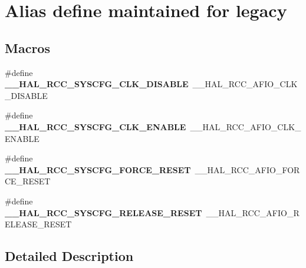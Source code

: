 \hypertarget{group___r_c_c___alias___for___legacy}{}\section{Alias define maintained for legacy}
\label{group___r_c_c___alias___for___legacy}
\subsection*{Macros}
\begin{DoxyCompactItemize}
\item 
\mbox{\label{group___r_c_c___alias___for___legacy_ga524cb83b267a1cac3c64843d79d43e77}} 
\#define {\bfseries \+\_\+\+\_\+\+H\+A\+L\+\_\+\+R\+C\+C\+\_\+\+S\+Y\+S\+C\+F\+G\+\_\+\+C\+L\+K\+\_\+\+D\+I\+S\+A\+B\+LE}~\+\_\+\+\_\+\+H\+A\+L\+\_\+\+R\+C\+C\+\_\+\+A\+F\+I\+O\+\_\+\+C\+L\+K\+\_\+\+D\+I\+S\+A\+B\+LE
\item 
\mbox{\label{group___r_c_c___alias___for___legacy_ga1e50d7ed8e42180bf3096dc1eafa72f2}} 
\#define {\bfseries \+\_\+\+\_\+\+H\+A\+L\+\_\+\+R\+C\+C\+\_\+\+S\+Y\+S\+C\+F\+G\+\_\+\+C\+L\+K\+\_\+\+E\+N\+A\+B\+LE}~\+\_\+\+\_\+\+H\+A\+L\+\_\+\+R\+C\+C\+\_\+\+A\+F\+I\+O\+\_\+\+C\+L\+K\+\_\+\+E\+N\+A\+B\+LE
\item 
\mbox{\label{group___r_c_c___alias___for___legacy_ga463cabb3db996d551bd0d43a70dd6089}} 
\#define {\bfseries \+\_\+\+\_\+\+H\+A\+L\+\_\+\+R\+C\+C\+\_\+\+S\+Y\+S\+C\+F\+G\+\_\+\+F\+O\+R\+C\+E\+\_\+\+R\+E\+S\+ET}~\+\_\+\+\_\+\+H\+A\+L\+\_\+\+R\+C\+C\+\_\+\+A\+F\+I\+O\+\_\+\+F\+O\+R\+C\+E\+\_\+\+R\+E\+S\+ET
\item 
\mbox{\label{group___r_c_c___alias___for___legacy_ga9eaf6d564e3273977b23f9519747f0bf}} 
\#define {\bfseries \+\_\+\+\_\+\+H\+A\+L\+\_\+\+R\+C\+C\+\_\+\+S\+Y\+S\+C\+F\+G\+\_\+\+R\+E\+L\+E\+A\+S\+E\+\_\+\+R\+E\+S\+ET}~\+\_\+\+\_\+\+H\+A\+L\+\_\+\+R\+C\+C\+\_\+\+A\+F\+I\+O\+\_\+\+R\+E\+L\+E\+A\+S\+E\+\_\+\+R\+E\+S\+ET
\end{DoxyCompactItemize}


\subsection{Detailed Description}
